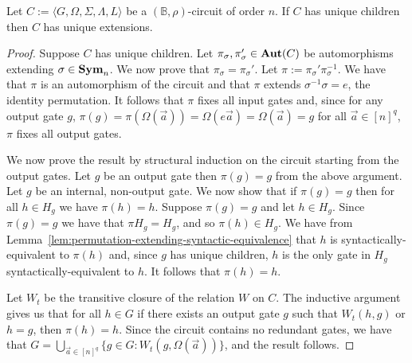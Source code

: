 \documentclass[../paper.tex]{subfiles}
\begin{document}
\begin{prop}
  Let $C := \langle G, \Omega, \Sigma, \Lambda, L\rangle$ be a $(\mathbb{B},
  \rho)$-circuit of order $n$. If $C$ has unique children then $C$ has unique
  extensions.
  \label{prop:unique-children-unique-extensions}
\end{prop}
\begin{proof}
  Suppose $C$ has unique children. Let $\pi_{\sigma}, \pi_{\sigma}' \in \text{\textbf{Aut}}(C)$
  be automorphisms extending $\sigma \in \text{\textbf{Sym}}_n$. We now prove that $\pi_\sigma
  = \pi_{\sigma}'$. Let $\pi := \pi_{\sigma}'\pi^{-1}_\sigma$. We have that
  $\pi$ is an automorphism of the circuit and that $\pi$ extends
  $\sigma^{-1}\sigma = e$, the identity permutation. It follows that $\pi$ fixes
  all input gates and, since for any output gate $g$, $\pi (g) = \pi
  (\Omega(\vec{a})) = \Omega(e \vec{a}) = \Omega(\vec{a}) = g$ for all $\vec{a}
  \in [n]^q$, $\pi$ fixes all output gates.

  We now prove the result by structural induction on the circuit starting from
  the output gates. Let $g$ be an output gate then $\pi (g) = g$ from the above
  argument. Let $g$ be an internal, non-output gate. We now show that if $\pi
  (g) = g$ then for all $h \in H_g$ we have $\pi (h) = h$. Suppose $\pi (g) = g$
  and let $h \in H_g$. Since $\pi (g) = g$ we have that $\pi H_{g} = H_g$, and
  so $\pi (h) \in H_g$. We have from
  Lemma~\ref{lem:permutation-extending-syntactic-equivalence} that $h$ is
  syntactically-equivalent to $\pi (h)$ and, since $g$ has unique children, $h$
  is the only gate in $H_g$ syntactically-equivalent to $h$. It follows that
  $\pi (h) = h$.
  
  Let $W_t$ be the transitive closure of the relation $W$ on $C$. The inductive
  argument gives us that for all $h \in G$ if there exists an output gate $g$
  such that $W_t(h, g)$ or $h = g$, then $\pi (h) = h$. Since the circuit
  contains no redundant gates, we have that $G = \bigcup_{\vec{a} \in [n]^q} \{g
  \in G : W_t (g, \Omega(\vec{a}))\}$, and the result follows.
\end{proof}
\end{document}
